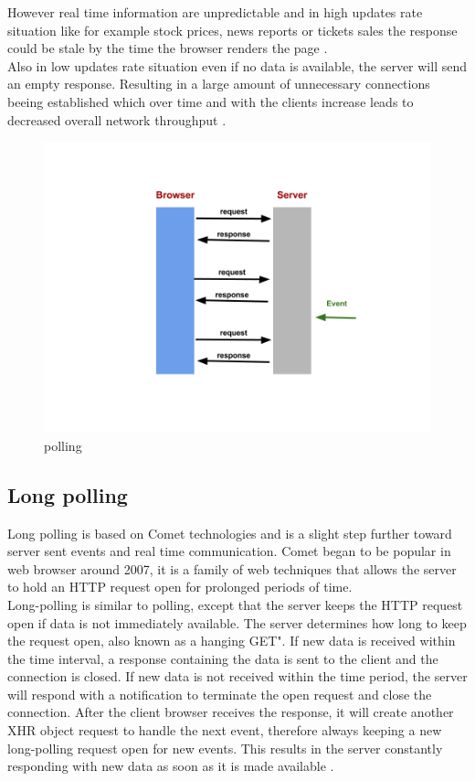 However real time information are unpredictable and in high updates rate
situation like for example stock prices, news reports or tickets sales the
response could be stale by the time the browser renders the page
\citep{Reference32}.\\

Also in low updates rate situation even if no data is available, the server
will send an empty response. Resulting in a large amount of unnecessary
connections beeing established which over time and with the clients increase
leads to decreased overall network throughput \citep{Reference2}. \\

\begin{figure}[H]
\centering
\includegraphics[width=\textwidth]{./Figures/polling.png}
\caption[polling]{polling}
\label{fig:polling}
\end{figure}

\subsection{Long polling}

Long polling is based on Comet technologies and is a slight step further toward
server sent events and real time communication. Comet began to be popular in web
browser around 2007, it is a family of web techniques that allows the server to
hold an HTTP request open for prolonged periods of time.\\

Long-polling is similar to polling, except that the server keeps the HTTP
request open if data is not immediately available. The server determines how
long to keep the request open, also known as a hanging GET". If new data is
received within the time interval, a response containing the data is sent to
the client and the connection is closed. If new data is not received within the
time period, the server will respond with a notification to terminate the open
request and close the connection. After the client browser receives the
response, it will create another XHR object request to handle the next event,
therefore always keeping a new long-polling request open for new events. This
results in the server constantly responding with new data as soon as it is made
available \citep{Reference2}.\\

